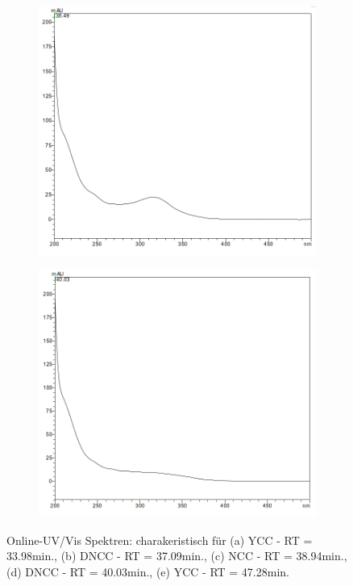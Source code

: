 \begin{figure}[!htbp]
  \begin{subfigure}[b]{0.5\textwidth}
    \includegraphics[width=\textwidth]{figures/Kapitel6/Reaktion3h/NCC3849.png}
    \caption{}
    \label{fig:NCC3849}
  \end{subfigure}
  \hfill
  \begin{subfigure}[b]{0.5\textwidth}
    \includegraphics[width=\textwidth]{figures/Kapitel6/Reaktion3h/DNCC4003.png}
    \caption{}
    \label{fig:DNCC4003}
  \end{subfigure}
  \caption[Online-UV/Vis Spektren mit der Charakteristik eines YCC bei 33.98min., eines DNCC bei 37.09min. eines NCC bei 38.94min. sowie eines DNCC bei 40.03min., Quelle: Autor]{Online-UV/Vis Spektren: charakeristisch für (a) \gls{YCC} - RT = 33.98min., (b) \gls{DNCC} - RT = 37.09min., (c) \gls{NCC} - RT = 38.94min., (d) \gls{DNCC} - RT = 40.03min., (e) \gls{YCC} - RT = 47.28min.}
\end{figure}

